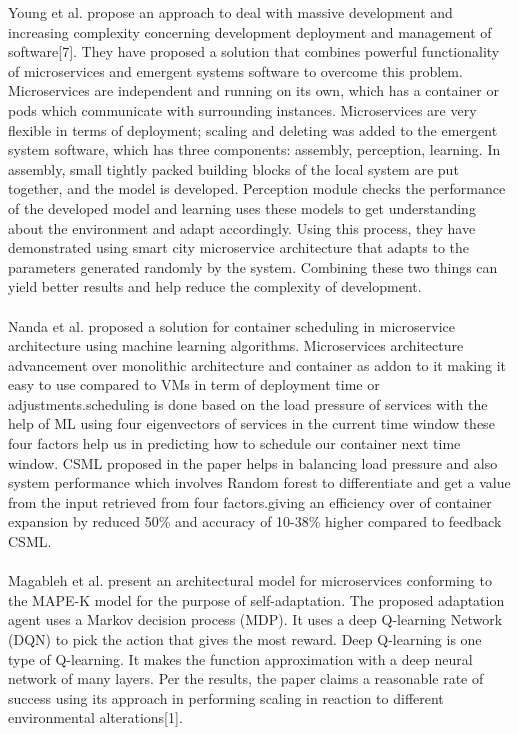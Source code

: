 \documentclass[conference]{IEEEtran}
\begin{document}
 Young et al. propose an approach to deal with massive development and increasing complexity concerning development deployment and management of software[7]. They have proposed a solution that combines powerful functionality of microservices and emergent systems software to overcome this problem. Microservices are independent and running on its own, which has a container or pods which communicate with surrounding instances. Microservices are very flexible in terms of deployment; scaling and deleting was added to the emergent system software, which has three components: assembly, perception, learning. In assembly, small tightly packed building blocks of the local system are put together, and the model is developed. Perception module checks the performance of the developed model and learning uses these models to get understanding about the environment and adapt accordingly. Using this process, they have demonstrated using smart city microservice architecture that adapts to the parameters generated randomly by the system. Combining these two things can yield better results and help reduce the complexity of development. \\ \\

Nanda et al. proposed a solution for container scheduling in microservice architecture using machine learning algorithms. Microservices architecture advancement over monolithic architecture and container as addon to it making it easy to use compared to VMs in term of deployment time or adjustments.scheduling is done based on the load pressure of services with the help of ML using four eigenvectors of services in the current time window these four factors help us in predicting how to schedule our container next time window. CSML proposed in the paper helps in balancing load pressure and also system performance which involves Random forest to differentiate and get a value from the input retrieved from four factors.giving an efficiency over of container expansion by reduced 50\% and accuracy of 10-38\% higher compared to feedback CSML. \\ \\

Magableh et al. present an architectural model for microservices conforming to the MAPE-K model for the purpose of self-adaptation. The proposed adaptation agent uses a Markov decision process (MDP). It uses a deep Q-learning Network (DQN) to pick the action that gives the most reward. Deep Q-learning is one type of Q-learning. It makes the function approximation with a deep neural network of many layers. Per the results, the paper claims a reasonable rate of success using its approach in performing scaling in reaction to different environmental alterations[1]. \\ \\
\end{document}
